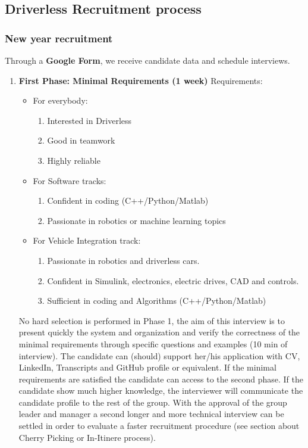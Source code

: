 \documentclass[graybox]{svmult}
\begin{document}
\subsection{Driverless Recruitment process}
\subsubsection{New year recruitment}

Through a \textbf{Google Form}, we receive candidate data and schedule interviews.

\begin{enumerate}
  \item \textbf{First Phase: Minimal Requirements (1 week)}
  Requirements:
  \begin{itemize}
    \item For everybody:
    \begin{enumerate}
      \item Interested in Driverless
      \item Good in teamwork
      \item Highly reliable
    \end{enumerate}
    \item For Software tracks:
    \begin{enumerate}
      \item Confident in coding (C++/Python/Matlab)
      \item Passionate in robotics or machine learning topics
    \end{enumerate}
    \item For Vehicle Integration track:
    \begin{enumerate}
    	\item Passionate in robotics and driverless cars.
    	\item Confident in Simulink, electronics, electric drives, CAD and controls.
        \item Sufficient in coding and Algorithms (C++/Python/Matlab)
    \end{enumerate}
  \end{itemize}


No hard selection is performed in Phase 1, the aim of this interview is to present quickly the system and organization and verify the correctness of the minimal requirements through specific questions and examples (10 min of interview). The candidate can (should) support her/his application with CV, LinkedIn, Transcripts and GitHub profile or equivalent.
If the minimal requirements are satisfied the candidate can access to the second phase.
If the candidate show much higher knowledge, the interviewer will communicate the candidate profile to the rest of the group. With the approval of the group leader and manager a second longer and more technical interview can be settled in order to evaluate a faster recruitment procedure (see section about Cherry Picking or In-Itinere process).


\end{enumerate}
\end{document}
